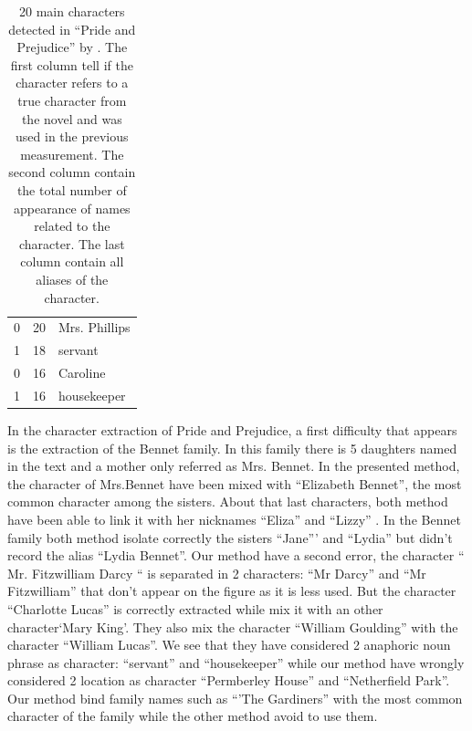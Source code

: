\documentclass[a4paper, 12pt]{report}
\begin{document}
\begin{table}[]
{\begin{tabular}{lll}
0             & 20       & Mrs. Phillips                                                                            \\
1             & 18       & servant                                                                                 \\
0             & 16       & Caroline                                                                                  \\
1             & 16       & housekeeper                                                                    \\
\end{tabular}}
\caption{20 main characters detected in ``Pride and Prejudice'' by \cite{character_meta}. The first column tell if the character refers to a true character from the novel and was used in the previous measurement. The second column contain the total number of appearance of names related to the character. The last column contain all aliases of the character. }

\end{table}

In the character extraction of Pride and Prejudice, a first difficulty that appears is the extraction of the Bennet family. In this family there is 5 daughters named in the text and a mother only referred as Mrs. Bennet. In the presented method, the character of Mrs.Bennet have been mixed with ``Elizabeth Bennet'', the most common character among the sisters. About that last characters, both method have been able to link it with her nicknames ``Eliza'' and ``Lizzy'' . In the Bennet family both method isolate correctly the sisters ``Jane''' and ``Lydia'' but \cite{character_meta} didn't record the alias ``Lydia Bennet''. Our method have a second error, the character `` Mr. Fitzwilliam Darcy `` is separated in 2 characters: ``Mr Darcy'' and ``Mr Fitzwilliam'' that don't appear on the figure as it is less used. But the character ``Charlotte Lucas'' is correctly extracted while \cite{character_meta} mix it with an other character`Mary King'. They also mix the character ``William Goulding'' with the character ``William Lucas''. We see that they have considered 2 anaphoric noun phrase as character: ``servant'' and ``housekeeper'' while our method have wrongly considered 2 location as character ``Permberley House'' and ``Netherfield Park''. Our method bind family names such as ``'The Gardiners'' with the most common character of the family while the other method avoid to use them.\\
\end{document}

